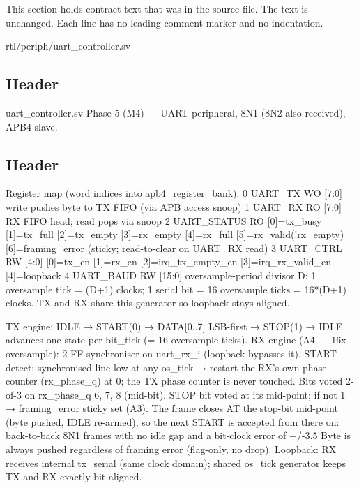 This section holds contract text that was in the source file. The text is unchanged. Each line has no leading comment marker and no indentation.

\begin{relocated}{rtl/periph/uart_controller.sv}

\subsection*{Header}

\begin{textblock}
uart_controller.sv
Phase 5 (M4) — UART peripheral, 8N1 (8N2 also received), APB4 slave.
\end{textblock}

\subsection*{Header}

\begin{textblock}
Register map (word indices into apb4_register_bank):
  0  UART_TX     WO [7:0]  write pushes byte to TX FIFO (via APB access snoop)
  1  UART_RX     RO [7:0]  RX FIFO head; read pops via snoop
  2  UART_STATUS RO        [0]=tx_busy [1]=tx_full [2]=tx_empty
                           [3]=rx_empty [4]=rx_full [5]=rx_valid(!rx_empty)
                           [6]=framing_error (sticky; read-to-clear on UART_RX read)
  3  UART_CTRL   RW [4:0]  [0]=tx_en [1]=rx_en [2]=irq_tx_empty_en
                           [3]=irq_rx_valid_en [4]=loopback
  4  UART_BAUD   RW [15:0] oversample-period divisor D:
                           1 oversample tick = (D+1) clocks;
                           1 serial bit      = 16 oversample ticks = 16*(D+1) clocks.
                           TX and RX share this generator so loopback stays aligned.

TX engine: IDLE → START(0) → DATA[0..7] LSB-first → STOP(1) → IDLE
           advances one state per bit_tick (= 16 oversample ticks).
RX engine (A4 — 16x oversample):
  2-FF synchroniser on uart_rx_i (loopback bypasses it).
  START detect: synchronised line low at any os_tick → restart the RX's own
  phase counter (rx_phase_q) at 0; the TX phase counter is never touched.
  Bits voted 2-of-3 on rx_phase_q 6, 7, 8 (mid-bit).
  STOP bit voted at its mid-point; if not 1 → framing_error sticky set (A3).
  The frame closes AT the stop-bit mid-point (byte pushed, IDLE re-armed), so
  the next START is accepted from there on: back-to-back 8N1 frames with no
  idle gap and a bit-clock error of +/-3.5 %
  Byte is always pushed regardless of framing error (flag-only, no drop).
Loopback: RX receives internal tx_serial (same clock domain); shared os_tick
          generator keeps TX and RX exactly bit-aligned.


\end{textblock}
\end{relocated}

